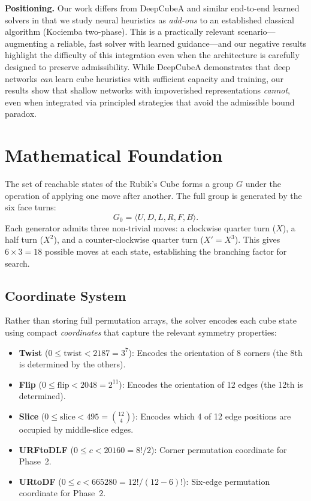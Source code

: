 \documentclass[10pt,twocolumn,a4paper]{article}
\begin{document}
\textbf{Positioning.}
Our work differs from DeepCubeA and similar end-to-end learned solvers in that we study neural heuristics as \emph{add-ons} to an established classical algorithm (Kociemba two-phase). This is a practically relevant scenario---augmenting a reliable, fast solver with learned guidance---and our negative results highlight the difficulty of this integration even when the architecture is carefully designed to preserve admissibility. While DeepCubeA demonstrates that deep networks \emph{can} learn cube heuristics with sufficient capacity and training, our results show that shallow networks with impoverished representations \emph{cannot}, even when integrated via principled strategies that avoid the admissible bound paradox.

\section{Mathematical Foundation}
\label{sec:math}

The set of reachable states of the Rubik's Cube forms a group $G$ under the operation of applying one move after another. The full group is generated by the six face turns:
\begin{equation}
G_0 = \langle U, D, L, R, F, B \rangle.
\end{equation}
Each generator admits three non-trivial moves: a clockwise quarter turn ($X$), a half turn ($X^2$), and a counter-clockwise quarter turn ($X' = X^3$). This gives $6 \times 3 = 18$ possible moves at each state, establishing the branching factor for search.

\subsection{Coordinate System}
\label{sec:coordinates}
Rather than storing full permutation arrays, the solver encodes each cube state using compact \emph{coordinates} that capture the relevant symmetry properties:

\begin{itemize}[leftmargin=*]
  \item \textbf{Twist} ($0 \leq \text{twist} < 2187 = 3^7$): Encodes the orientation of 8 corners (the 8th is determined by the others).
  \item \textbf{Flip} ($0 \leq \text{flip} < 2048 = 2^{11}$): Encodes the orientation of 12 edges (the 12th is determined).
  \item \textbf{Slice} ($0 \leq \text{slice} < 495 = \binom{12}{4}$): Encodes which 4 of 12 edge positions are occupied by middle-slice edges.
  \item \textbf{URFtoDLF} ($0 \leq c < 20160 = 8!/2$): Corner permutation coordinate for Phase~2.
  \item \textbf{URtoDF} ($0 \leq c < 665280 = 12!/(12{-}6)!$): Six-edge permutation coordinate for Phase~2.
\end{itemize}
\end{document}
